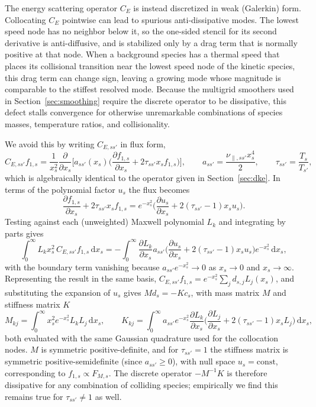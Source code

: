 \documentclass[11pt]{article}
\begin{document}
The energy scattering operator $C_E$ is instead discretized in weak
(Galerkin) form. Collocating $C_E$ pointwise can lead to spurious anti-dissipative modes.
The lowest speed node has no neighbor below it, so the
one-sided stencil for its second derivative is anti-diffusive,
and is stabilized only by a drag term that is normally positive at that node.
When a background species has a thermal speed that places its collisional
transition near the lowest speed node of the kinetic species, this drag term
can change sign, leaving a growing mode whose magnitude is
comparable to the stiffest resolved mode. Because the multigrid smoothers
used in Section~\ref{sec:smoothing} require the discrete operator to be
dissipative, this defect stalls convergence for otherwise unremarkable
combinations of species masses, temperature ratios, and collisionality.

We avoid this by writing $C_{E,ss'}$ in flux form,
\begin{equation}
C_{E,ss'} f_{1,s} = \frac{1}{x_s^2}\frac{\partial}{\partial x_s}\Bigg[
a_{ss'}(x_s) \Bigg(\frac{\partial f_{1,s}}{\partial x_s}
+ 2\tau_{ss'} x_s f_{1,s}\Bigg)\Bigg], \qquad
a_{ss'} = \frac{\nu_{\parallel,ss'} x_s^4}{2}, \qquad
\tau_{ss'} = \frac{T_s}{T_{s'}},
\end{equation}
which is algebraically identical to the operator given in
Section~\ref{sec:dke}. In terms of the polynomial factor $u_s$ the flux becomes
\begin{equation}
\frac{\partial f_{1,s}}{\partial x_s} + 2\tau_{ss'} x_s f_{1,s}
= e^{-x_s^2}\Bigg(\frac{\partial u_s}{\partial x_s}
+ 2(\tau_{ss'} - 1) x_s u_s\Bigg).
\end{equation}
Testing against each (unweighted) Maxwell polynomial $L_k$ and
integrating by parts gives
\begin{equation}
\int_0^\infty L_k x_s^2 \, C_{E,ss'} f_{1,s}
\,\mathrm{d}x_s = -\int_0^\infty \frac{\partial L_k}{\partial x_s}
a_{ss'}\Bigg(\frac{\partial u_s}{\partial x_s}
+ 2(\tau_{ss'} - 1) x_s u_s\Bigg) e^{-x_s^2} \,\mathrm{d}x_s,
\end{equation}
with the boundary term vanishing because $a_{ss'} e^{-x_s^2} \to 0$ as
$x_s \rightarrow 0$ and $x_s \rightarrow \infty$. Representing the result in
the same basis, $C_{E,ss'} f_{1,s} = e^{-x_s^2} \sum_j d_{s,j} L_j(x_s)$, and
substituting the expansion of $u_s$ gives $M d_s = -K c_s$, with mass matrix $M$ and
stiffness matrix $K$
\begin{equation}
M_{kj} = \int_0^\infty x_s^2 e^{-x_s^2} L_k L_j \,\mathrm{d}x_s, \qquad
K_{kj} = \int_0^\infty a_{ss'} e^{-x_s^2} \frac{\partial L_k}{\partial x_s}
\Bigg(\frac{\partial L_j}{\partial x_s} + 2(\tau_{ss'} - 1) x_s L_j\Bigg)
\,\mathrm{d}x_s,
\end{equation}
both evaluated with the same Gaussian quadrature used for the collocation
nodes. $M$ is symmetric positive-definite, and for $\tau_{ss'}=1$ the stiffness
matrix is symmetric positive-semidefinite (since $a_{ss'} \geq 0$), with null
space $u_s = \mathrm{const}$, corresponding to $f_{1,s} \propto F_{M,s}$. The
discrete operator $-M^{-1}K$ is therefore
dissipative for any combination of colliding species; empirically we find
this remains true for $\tau_{ss'} \neq 1$ as well.
\end{document}
